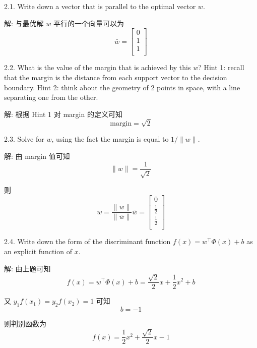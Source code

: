 \documentclass{article}
\begin{document}
2.1. Write down a vector that is parallel to the optimal vector $w$.

解: 与最优解 $w$ 平行的一个向量可以为
\begin{equation}
  \bar{w}=
    \begin{bmatrix}
      0\\ 1\\ 1\\
    \end{bmatrix}
\end{equation}

2.2. What is the value of the margin that is achieved by this $w$? Hint 1: recall that the margin is the distance from each support vector to the decision boundary. Hint 2: think about the geometry of 2 points in space, with a line separating one from the other.

解: 根据 Hint 1 对 margin 的定义可知
\begin{equation}
  \mathrm{margin}=\sqrt{2}
\end{equation}

2.3. Solve for $w$, using the fact the margin is equal to $1/\|w\|$.

解: 由 margin 值可知
\begin{equation}
  \|w\|=\frac{1}{\sqrt{2}}
\end{equation}

则
\begin{equation}
  w=\frac{\|w\|}{\|\bar{w}\|}\bar{w}=
  \begin{bmatrix}
    0\\ \frac{1}{2}\\ \frac{1}{2}\\
  \end{bmatrix}
\end{equation}

2.4. Write down the form of the discriminant function $ f(x) = w^{\top}\Phi(x) + b$ as an explicit function of $x$.

解: 由上题可知
\begin{equation}
  f(x) = w^{\top}\Phi(x) + b=\frac{\sqrt{2}}{2}x+\frac{1}{2}x^2+b
\end{equation}

又 $y_1f(x_1)=y_2f(x_2)=1$ 可知
\begin{equation}
  b=-1
\end{equation}

则判别函数为
\begin{equation}
  f(x)=\frac{1}{2}x^2+\frac{\sqrt{2}}{2}x-1
\end{equation}
\end{document}
